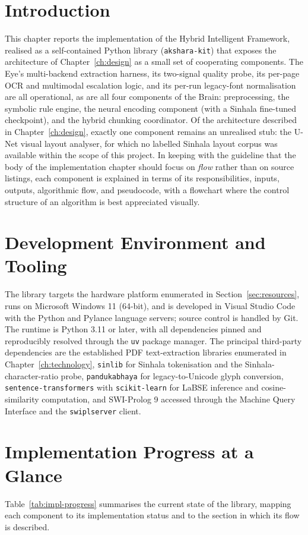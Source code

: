 \documentclass[12pt,a4paper,oneside]{report}
\begin{document}
\section{Introduction}
This chapter reports the implementation of the Hybrid Intelligent Framework, realised as a self-contained Python library (\texttt{akshara-kit}) that exposes the architecture of Chapter~\ref{ch:design} as a small set of cooperating components. The Eye's multi-backend extraction harness, its two-signal quality probe, its per-page OCR and multimodal escalation logic, and its per-run legacy-font normalisation are all operational, as are all four components of the Brain: preprocessing, the symbolic rule engine, the neural encoding component (with a Sinhala fine-tuned checkpoint), and the hybrid chunking coordinator. Of the architecture described in Chapter~\ref{ch:design}, exactly one component remains an unrealised stub: the U-Net visual layout analyser, for which no labelled Sinhala layout corpus was available within the scope of this project. In keeping with the guideline that the body of the implementation chapter should focus on \textit{flow} rather than on source listings, each component is explained in terms of its responsibilities, inputs, outputs, algorithmic flow, and pseudocode, with a flowchart where the control structure of an algorithm is best appreciated visually.

\section{Development Environment and Tooling}
\label{sec:impl-environment}
The library targets the hardware platform enumerated in Section~\ref{sec:resources}, runs on Microsoft Windows 11 (64-bit), and is developed in Visual Studio Code with the Python and Pylance language servers; source control is handled by Git. The runtime is Python 3.11 or later, with all dependencies pinned and reproducibly resolved through the \texttt{uv} package manager. The principal third-party dependencies are the established PDF text-extraction libraries enumerated in Chapter~\ref{ch:technology}, \texttt{sinlib} for Sinhala tokenisation and the Sinhala-character-ratio probe, \texttt{pandukabhaya} for legacy-to-Unicode glyph conversion, \texttt{sentence-transformers} with \texttt{scikit-learn} for LaBSE inference and cosine-similarity computation, and SWI-Prolog 9 accessed through the Machine Query Interface and the \texttt{swiplserver} client.

\section{Implementation Progress at a Glance}
\label{sec:impl-progress}
Table~\ref{tab:impl-progress} summarises the current state of the library, mapping each component to its implementation status and to the section in which its flow is described.
\end{document}
